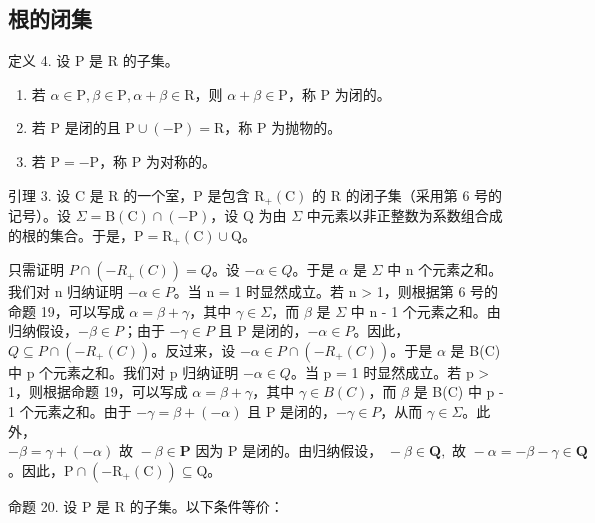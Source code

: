 \subsection{根的闭集}

定义 4. 设 P 是 R 的子集。

\begin{enumerate}
\def\labelenumi{(\roman{enumi})}
\item
  若 \(\alpha \in \mathrm{P},\beta \in \mathrm{P},\alpha +\beta \in \mathrm{R}\)，则 \(\alpha +\beta \in \mathrm{P}\)，称 P 为闭的。
\item
  若 P 是闭的且 \(\mathrm{P} \cup (-\mathrm{P}) = \mathrm{R}\)，称 P 为抛物的。
\item
  若 \(\mathrm{P} = -\mathrm{P}\)，称 P 为对称的。
\end{enumerate}

引理 3. 设 C 是 R 的一个室，P 是包含 \(\mathrm{R}_{+}(\mathrm{C})\) 的 R 的闭子集（采用第 6 号的记号）。设 \(\Sigma = \mathrm{B}(\mathrm{C}) \cap (-\mathrm{P})\)，设 Q 为由 \(\Sigma\) 中元素以非正整数为系数组合成的根的集合。于是，\(\mathrm{P} = \mathrm{R}_{+}(\mathrm{C}) \cup \mathrm{Q}\)。

只需证明 \(P \cap (-R_{+}(C)) = Q\)。设 \(-\alpha \in Q\)。于是 \(\alpha\) 是 \(\Sigma\) 中 n 个元素之和。我们对 n 归纳证明 \(-\alpha \in P\)。当 n = 1 时显然成立。若 n \textgreater{} 1，则根据第 6 号的命题 19，可以写成 \(\alpha = \beta + \gamma\)，其中 \(\gamma \in \Sigma\)，而 \(\beta\) 是 \(\Sigma\) 中 n - 1 个元素之和。由归纳假设，\(-\beta \in P\)；由于 \(-\gamma \in P\) 且 P 是闭的，\(-\alpha \in P\)。因此，\(Q \subseteq P \cap (-R_{+}(C))\)。反过来，设 \(-\alpha \in P \cap (-R_{+}(C))\)。于是 \(\alpha\) 是 B(C) 中 p 个元素之和。我们对 p 归纳证明 \(-\alpha \in Q\)。当 p = 1 时显然成立。若 p \textgreater{} 1，则根据命题 19，可以写成 \(\alpha = \beta + \gamma\)，其中 \(\gamma \in B(C)\)，而 \(\beta\) 是 B(C) 中 p - 1 个元素之和。由于 \(-\gamma = \beta + (-\alpha)\) 且 P 是闭的，\(-\gamma \in P\)，从而 \(\gamma \in \Sigma\)。此外，\(-\beta = \gamma + (-\alpha) \text{ 故 } -\beta \in \mathbf{P} \text{ 因为 P 是闭的。由归纳假设， } -\beta \in \mathbf{Q}, \text{ 故 } -\alpha = -\beta - \gamma \in \mathbf{Q}\)。因此，\(\mathrm{P} \cap (-\mathrm{R}_{+}(\mathrm{C})) \subseteq \mathrm{Q}\)。

命题 20. 设 P 是 R 的子集。以下条件等价：


